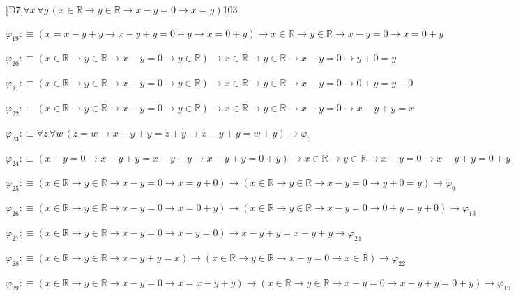 \begin{fullproof}{[D7]}{$\forall x\,\forall y\,(x \in \mathbb{R} \to y \in \mathbb{R} \to x - y = 0 \to x = y)$}{103}
\begin{abbrevlist}
\item $\varphi_{19} :\equiv (x = x - y + y \to x - y + y = 0 + y \to x = 0 + y) \to x \in \mathbb{R} \to y \in \mathbb{R} \to x - y = 0 \to x = 0 + y$
\item $\varphi_{20} :\equiv (x \in \mathbb{R} \to y \in \mathbb{R} \to x - y = 0 \to y \in \mathbb{R}) \to x \in \mathbb{R} \to y \in \mathbb{R} \to x - y = 0 \to y + 0 = y$
\item $\varphi_{21} :\equiv (x \in \mathbb{R} \to y \in \mathbb{R} \to x - y = 0 \to y \in \mathbb{R}) \to x \in \mathbb{R} \to y \in \mathbb{R} \to x - y = 0 \to 0 + y = y + 0$
\item $\varphi_{22} :\equiv (x \in \mathbb{R} \to y \in \mathbb{R} \to x - y = 0 \to y \in \mathbb{R}) \to x \in \mathbb{R} \to y \in \mathbb{R} \to x - y = 0 \to x - y + y = x$
\item $\varphi_{23} :\equiv \forall z\,\forall w\,(z = w \to x - y + y = z + y \to x - y + y = w + y) \to \varphi_{6}$
\item $\varphi_{24} :\equiv (x - y = 0 \to x - y + y = x - y + y \to x - y + y = 0 + y) \to x \in \mathbb{R} \to y \in \mathbb{R} \to x - y = 0 \to x - y + y = 0 + y$
\item $\varphi_{25} :\equiv (x \in \mathbb{R} \to y \in \mathbb{R} \to x - y = 0 \to x = y + 0) \to (x \in \mathbb{R} \to y \in \mathbb{R} \to x - y = 0 \to y + 0 = y) \to \varphi_{9}$
\item $\varphi_{26} :\equiv (x \in \mathbb{R} \to y \in \mathbb{R} \to x - y = 0 \to x = 0 + y) \to (x \in \mathbb{R} \to y \in \mathbb{R} \to x - y = 0 \to 0 + y = y + 0) \to \varphi_{13}$
\item $\varphi_{27} :\equiv (x \in \mathbb{R} \to y \in \mathbb{R} \to x - y = 0 \to x - y = 0) \to x - y + y = x - y + y \to \varphi_{24}$
\item $\varphi_{28} :\equiv (x \in \mathbb{R} \to y \in \mathbb{R} \to x - y + y = x) \to (x \in \mathbb{R} \to y \in \mathbb{R} \to x - y = 0 \to x \in \mathbb{R}) \to \varphi_{22}$
\item $\varphi_{29} :\equiv (x \in \mathbb{R} \to y \in \mathbb{R} \to x - y = 0 \to x = x - y + y) \to (x \in \mathbb{R} \to y \in \mathbb{R} \to x - y = 0 \to x - y + y = 0 + y) \to \varphi_{19}$
\end{abbrevlist}
\end{fullproof}
